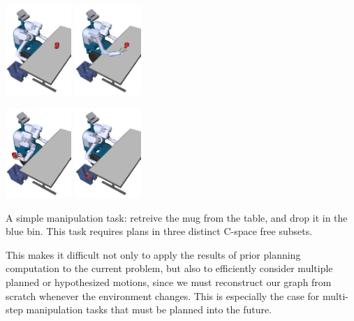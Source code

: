 \begin{marginfigure}
   \centering
   \includegraphics[width=2.5cm]{figs/herbbin/step0cropped.png}%
   \includegraphics[width=2.5cm]{figs/herbbin/step01cropped.png}

   \includegraphics[width=2.5cm]{figs/herbbin/step12cropped.png}%
   \includegraphics[width=2.5cm]{figs/herbbin/step2cropped.png}

   \caption{A simple manipulation task: retreive the mug from
      the table, and drop it in the blue bin.
      This task requires plans in three distinct C-space free subsets.}
   \label{fig:family:herbbin-multistep-example}
\end{marginfigure}

This makes it difficult not only to apply the results of prior
planning computation to the current problem,
but also to efficiently consider multiple planned or hypothesized
motions,
since we must reconstruct our graph from scratch whenever
the environment changes.
This is especially the case for
multi-step manipulation tasks that must be planned into the future.

